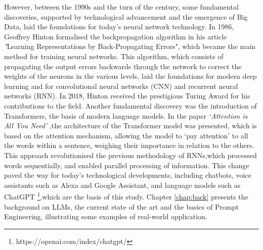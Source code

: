 However, between the 1990s and the turn of the century, some fundamental discoveries, supported by technological advancement and the emergence of Big Data, laid the foundations for today's neural network technology.
In 1986, Geoffrey Hinton formalised the backpropagation algorithm in his article \textit"{Learning Representations by Back-Propagating Errors}"\cite{Rumelhart1986LearningRB},  which became the main method for training neural networks. 
This algorithm, which consists of propagating the output errors backwards through the network to correct the weights of the neurons in the various levels, laid the foundations for modern deep learning and for convolutional neural networks (CNN)\cite{Cnn} and recurrent neural networks (RNN)\cite{Rnn}.
In 2018, Hinton received the prestigious Turing Award for his contributions to the field.
Another fundamental discovery was the introduction of Transformers, the basis of modern language models. 
In the paper \textit{‘Attention is All You Need’} \cite{Attention},the architecture of the Transformer model was presented, which is based on the attention mechanism, allowing the model to ‘pay attention’ to all the words within a sentence, weighing their importance in relation to the others.
This approach revolutionised the previous methodology of RNNs\cite{Rnn},which processed words sequentially, and enabled parallel processing of information.
This change paved the way for today's technological developments, including chatbots, voice assistants such as Alexa and Google Assistant, and language models such as ChatGPT \footnote{https://openai.com/index/chatgpt/},which are the basis of this study. 
Chapter \ref{chap:back} presents the background on LLMs, the current state of the art and the basics of Prompt Engineering, illustrating some examples of real-world application.

